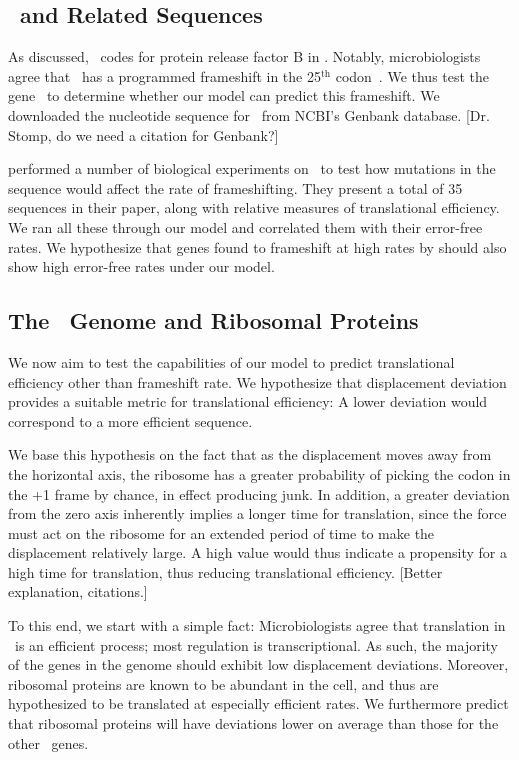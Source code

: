 \documentclass[12pt]{article}
\numberwithin{equation}{section}
\begin{document}
\subsection{\prfB\ and Related Sequences}
As discussed, \prfB\ codes for protein release factor B in \ecoli.
Notably, microbiologists agree that \prfB\ has a programmed frameshift
in the 25$^\textrm{th}$ codon~\cite{weiss87}.  We thus test the
gene \prfB\ to determine whether our model can predict this
frameshift.  We downloaded the nucleotide sequence for \prfB\ from
NCBI's Genbank database.  [Dr. Stomp, do we need a citation for Genbank?]

\citet{weiss87} performed a number of biological experiments on
\prfB\ to test how mutations in the sequence would affect the rate of
frameshifting.  They present a total of 35 sequences in their paper,
along with relative measures of translational efficiency.  We ran all
these through our model and correlated them with their error-free rates.
We hypothesize that genes found to frameshift at high rates by
\citeauthor{weiss87} should also show high error-free rates under
our model.

\subsection{The \ecoli\ Genome and Ribosomal Proteins}
We now aim to test the capabilities of our model to predict translational
efficiency other than frameshift rate.  We hypothesize that displacement
deviation provides a suitable metric for translational efficiency:  A lower
deviation would correspond to a more efficient sequence.  

We base this 
hypothesis on the fact that as the displacement moves away from the 
horizontal axis, the ribosome has a greater probability of picking the
codon in the +1 frame by chance, in effect producing junk.  In addition,
a greater deviation from the zero axis inherently implies a longer
time for translation, since the force must act on the ribosome for an 
extended period of time to make the displacement relatively large.  A
high value would thus indicate a propensity for a high time for translation,
thus reducing translational efficiency.  [Better explanation, citations.]

To this end, we start with a simple fact:
Microbiologists agree that translation in \ecoli\ is an efficient process;
most regulation is transcriptional.  As such, the majority of the genes 
in the genome should exhibit low displacement deviations.  Moreover,
ribosomal proteins are known to be abundant in the cell, and thus
are hypothesized to be translated at especially efficient rates.  We
furthermore predict that ribosomal proteins will have deviations lower
on average than those for the other \ecoli\ genes.
\end{document}
